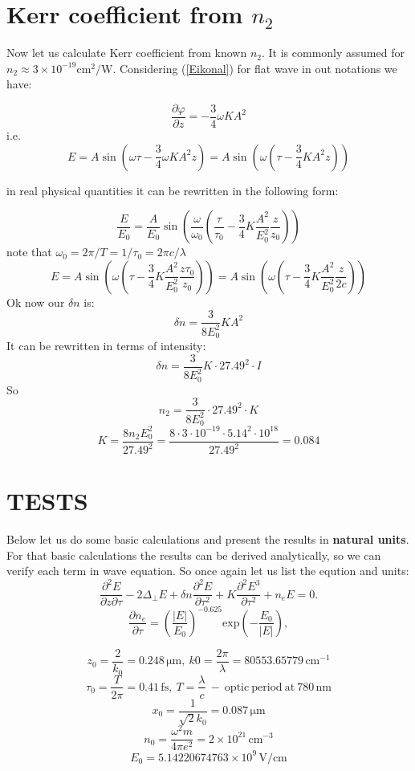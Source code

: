 \documentclass{article}
\newcommand{\dd}{\partial}
\newcommand{\ff}{\frac}
\begin{document}
\section{Kerr coefficient from $n_2$}
Now let us calculate Kerr coefficient from known $n_2$. It is commonly assumed for $n_2 \approx 3 \times 10^{-19} \mathrm{cm}^2/\mathrm{W}$.
Considering (\ref{Eikonal}) for flat wave in out notations we have:

\[ \ff{\dd \varphi}{\dd z} = -\ff{3}{4} \omega K A^2 \]
i.e.
\[ E = A \sin\left(\omega \tau - \ff{3}{4} \omega K A^2 z \right) = A \sin\left(\omega \left( \tau - \ff{3}{4} K A^2 z \right)\right) \]

in real physical quantities it can be rewritten in the following form:

\[ \ff{E}{E_0} = \ff{A}{E_0} \sin\left(\ff{\omega}{\omega_0} \left( \ff{\tau}{\tau_0} - \ff{3}{4} K \ff{A^2}{E^2_0} \ff{z}{z_0} \right)\right) \]
note that $\omega_0 = 2\pi/T = 1/\tau_0 = 2\pi c/\lambda$
\[ E = A \sin\left(\omega \left( \tau - \ff{3}{4} K \ff{A^2}{E^2_0} \ff{z \tau_0}{z_0} \right)\right) = A \sin\left(\omega \left(\tau - \ff{3}{4} K \ff{A^2}{E^2_0} \ff{z}{2 c} \right)\right)\]
Ok now our $\delta n$ is:
\[ \delta n = \ff{3}{8 E_0^2} K A^2 \]
It can be rewritten in terms of intensity:
\[ \delta n = \ff{3}{8 E_0^2} K \cdot 27.49^2 \cdot I \]
So
\[ n_2 = \ff{3}{8 E_0^2} \cdot 27.49^2 \cdot K \]
\[ K = \ff{8 n_2 E_0^2}{27.49^2} = \ff{8 \cdot 3 \cdot 10^{-19} \cdot 5.14^2 \cdot 10^{18}}{27.49^2} = 0.084 \]
\newpage
\section{TESTS}
Below let us do some basic calculations and present the results in \textbf{natural units}. For that basic calculations the results can be derived analytically,
so we can verify each term in wave equation. So once again let us list the eqution and units:
\[ \ff{\dd^2 E}{\dd z \dd \tau} - 2 \Delta_\perp E + \delta n \ff{\dd^2 E}{\dd \tau^2} + K \ff{\dd^2 E^3}{\dd \tau^2} + n_e E = 0. \]
\[ \ff{\dd n_e}{\dd \tau} = \left(\ff{\left|E\right|}{E_0}\right)^{-0.625} \mathrm{exp}\left(-\ff{E_0}{\left|E\right|}\right), \]


\[ z_0=\ff{2}{k_0}=0.248\,\mathrm{\mu m}, \ k0=\ff{2\pi}{\lambda}=80553.65779\,\mathrm{cm}^{-1} \]
\[ \tau_0=\ff{T}{2\pi}=0.41\,\mathrm{fs}, \ T=\ff{\lambda}{c} \mathrm{\ - \ optic \ period \ at \ 780 \, nm} \]
\[ x_0=\ff{1}{\sqrt{2}k_0}=0.087\,\mathrm{\mu m} \]
\[ n_0=\ff{\omega^2 m}{4 \pi e^2}=2\times10^{21}\,\mathrm{cm^{-3}} \]
\[ E_0=5.14220674763\times10^9 \, \mathrm{V}/\mathrm{cm} \]
\end{document}
